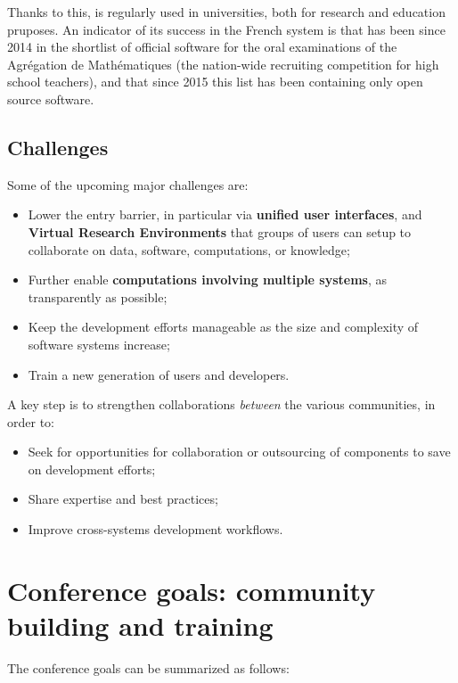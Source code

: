 \documentclass[12pt]{amsart}
\begin{document}
Thanks to this, \Sage is regularly used in universities, both for
research and education pruposes.  An indicator of its success in the French
system is that \Sage has been since 2014 in the shortlist of official
software for the oral examinations of the Agrégation de Mathématiques
(the nation-wide recruiting competition for high school teachers), and
that since 2015 this list has been containing only open source software.

\subsection{Challenges}

Some of the upcoming major challenges are:
\begin{itemize}
\item Lower the entry barrier, in particular via \textbf{unified user
    interfaces}, and \textbf{Virtual Research Environments} that
  groups of users can setup to collaborate on data, software,
  computations, or knowledge;
\item Further enable \textbf{computations involving multiple systems},
  as transparently as possible;
\item Keep the development efforts manageable as the size and
  complexity of software systems increase;
\item Train a new generation of users and developers.
\end{itemize}

A key step is to strengthen collaborations \emph{between} the various
communities, in order to:
\begin{itemize}
\item Seek for opportunities for collaboration or outsourcing of
  components to save on development efforts;
\item Share expertise and best practices;
\item Improve cross-systems development workflows.
\end{itemize}

\section{Conference goals: community building and training}

The conference goals can be summarized as follows:
\end{document}

